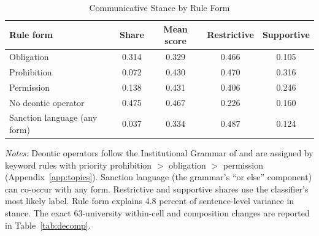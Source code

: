 \begin{table}[htbp]
\centering
\small
\caption{Communicative Stance by Rule Form}
\label{tab:rule-form}
\begin{threeparttable}
\begin{tabular}{lcccc}
\toprule
Rule form & Share & Mean score & Restrictive & Supportive \\
\midrule
Obligation & 0.314 & 0.329 & 0.466 & 0.105 \\
Prohibition & 0.072 & 0.430 & 0.470 & 0.316 \\
Permission & 0.138 & 0.431 & 0.406 & 0.246 \\
No deontic operator & 0.475 & 0.467 & 0.226 & 0.160 \\
\midrule
Sanction language (any form) & 0.037 & 0.334 & 0.487 & 0.124 \\
\bottomrule
\end{tabular}
\begin{tablenotes}[flushleft]\footnotesize
\item \textit{Notes:} Deontic operators follow the Institutional Grammar of \citet{crawford1995grammar} and are assigned by keyword rules with priority prohibition $>$ obligation $>$ permission (Appendix~\ref{app:topics}). Sanction language (the grammar's ``or else'' component) can co-occur with any form. Restrictive and supportive shares use the classifier's most likely label. Rule form explains 4.8 percent of sentence-level variance in stance. The exact 63-university within-cell and composition changes are reported in Table~\ref{tab:decomp}.
\end{tablenotes}
\end{threeparttable}
\end{table}
